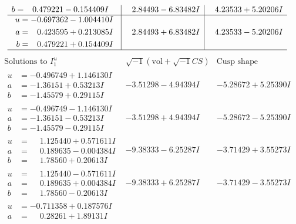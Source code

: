 \documentclass[1p]{elsarticle_modified}
\theoremstyle{definition}
\newcommand{\I}{\sqrt{-1}}
\begin{document}
$$\begin{array}{c|c|c}
\begin{aligned}
b &= \phantom{-}0.479221 - 0.154409 I\end{aligned}
 & \phantom{-}2.84493 - 6.83482 I & \phantom{-}4.23533 + 5.20206 I \\ \hline\begin{aligned}
u &= -0.697362 - 1.004410 I \\
a &= \phantom{-}0.423595 + 0.213085 I \\
b &= \phantom{-}0.479221 + 0.154409 I\end{aligned}
 & \phantom{-}2.84493 + 6.83482 I & \phantom{-}4.23533 - 5.20206 I\\
 \hline 
 \end{array}$$\newpage$$\begin{array}{c|c|c}  
\text{Solutions to }I^u_{1}& \I (\text{vol} + \sqrt{-1}CS) & \text{Cusp shape}\\
 \hline 
\begin{aligned}
u &= -0.496749 + 1.146130 I \\
a &= -1.36151 + 0.53213 I \\
b &= -1.45579 + 0.29115 I\end{aligned}
 & -3.51298 - 4.94394 I & -5.28672 + 5.25390 I \\ \hline\begin{aligned}
u &= -0.496749 - 1.146130 I \\
a &= -1.36151 - 0.53213 I \\
b &= -1.45579 - 0.29115 I\end{aligned}
 & -3.51298 + 4.94394 I & -5.28672 - 5.25390 I \\ \hline\begin{aligned}
u &= \phantom{-}1.125440 + 0.571611 I \\
a &= \phantom{-}0.189635 - 0.004384 I \\
b &= \phantom{-}1.78560 + 0.20613 I\end{aligned}
 & -9.38333 - 6.25287 I & -3.71429 + 3.55273 I \\ \hline\begin{aligned}
u &= \phantom{-}1.125440 - 0.571611 I \\
a &= \phantom{-}0.189635 + 0.004384 I \\
b &= \phantom{-}1.78560 - 0.20613 I\end{aligned}
 & -9.38333 + 6.25287 I & -3.71429 - 3.55273 I \\ \hline\begin{aligned}
u &= -0.711358 + 0.187576 I \\
a &= \phantom{-}0.28261 + 1.89131 I \\

\end{aligned}
\end{array}$$
\end{document}

